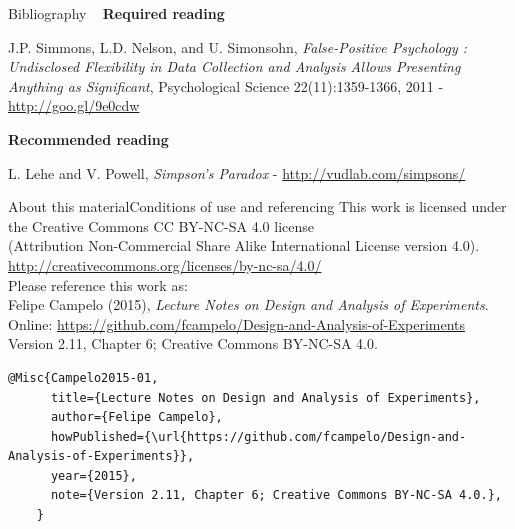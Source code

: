 \documentclass[t]{beamer}
\begin{document}

\begin{ftst}
{Bibliography}
{\ }
\scriptsize
\textbf{Required reading}

\benums 
\item J.P. Simmons, L.D. Nelson, and U. Simonsohn, \textit{False-Positive Psychology : Undisclosed Flexibility in Data Collection and Analysis Allows Presenting Anything as Significant}, Psychological Science 22(11):1359-1366, 2011 - \url{http://goo.gl/9e0cdw}
\eenum

\textbf{Recommended reading}

\benums L. Lehe and V. Powell, \textit{Simpson's Paradox} - \url{http://vudlab.com/simpsons/} 
\eenum
\end{ftst}


\begin{ftstf}{About this material}{Conditions of use and referencing}
\centering\footnotesize This work is licensed under the Creative Commons CC BY-NC-SA 4.0 license\\(Attribution Non-Commercial Share Alike International License version 4.0).\\
\vhalf
\url{http://creativecommons.org/licenses/by-nc-sa/4.0/}\\
\vone
\footnotesize Please reference this work as:\\
\footnotesize \flushleft Felipe Campelo (2015), \textit{Lecture Notes on Design and Analysis of Experiments}.\\Online: {\scriptsize\url{https://github.com/fcampelo/Design-and-Analysis-of-Experiments}}\\
Version 2.11, Chapter 6; Creative Commons BY-NC-SA 4.0.\\

\begin{Verbatim}[fontsize=\tiny]
    @Misc{Campelo2015-01,
      title={Lecture Notes on Design and Analysis of Experiments},
      author={Felipe Campelo},
      howPublished={\url{https://github.com/fcampelo/Design-and-Analysis-of-Experiments}},
      year={2015},
      note={Version 2.11, Chapter 6; Creative Commons BY-NC-SA 4.0.},
    }
\end{Verbatim}

\end{ftstf}
\end{document}
